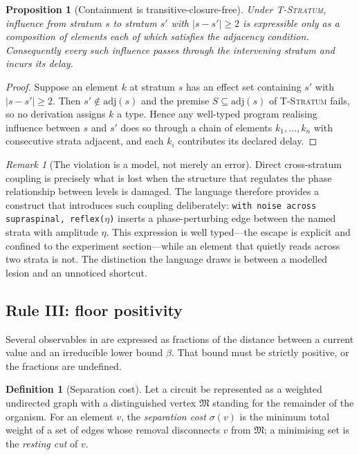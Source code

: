 \documentclass[11pt,twocolumn,a4paper]{article}
\theoremstyle{thmstyle}
\newtheorem{proposition}[theorem]{Proposition}
\theoremstyle{definition}
\newtheorem{definition}[theorem]{Definition}
\theoremstyle{remark}
\newtheorem{remark}[theorem]{Remark}
\newcommand{\med}{\mathfrak{M}}
\newcommand{\sep}{\sigma}
\newcommand{\flo}{\beta}
\newcommand{\abs}[1]{\lvert#1\rvert}
\begin{document}
\begin{proposition}[Containment is transitive-closure-free]
\label{prop:containment}
Under \textsc{T-Stratum}, influence from stratum $s$ to stratum $s'$ with
$\abs{s-s'}\ge2$ is expressible only as a composition of elements each of
which satisfies the adjacency condition. Consequently every such influence
passes through the intervening stratum and incurs its delay.
\end{proposition}

\begin{proof}
Suppose an element $k$ at stratum $s$ has an effect set containing $s'$ with
$\abs{s-s'}\ge2$. Then $s'\notin\mathrm{adj}(s)$ and the premise
$S\subseteq\mathrm{adj}(s)$ of \textsc{T-Stratum} fails, so no derivation
assigns $k$ a type. Hence any well-typed program realising influence between
$s$ and $s'$ does so through a chain of elements $k_1,\dots,k_n$ with
consecutive strata adjacent, and each $k_i$ contributes its declared delay.
\end{proof}

\begin{remark}[The violation is a model, not merely an error]
\label{rem:violation-is-model}
Direct cross-stratum coupling is precisely what is lost when the structure
that regulates the phase relationship between levels is damaged. The language
therefore provides a construct that introduces such coupling deliberately:
\texttt{with noise across supraspinal, reflex($\eta$)} inserts a
phase-perturbing edge between the named strata with amplitude $\eta$. This
expression is well typed---the escape is explicit and confined to the
experiment section---while an element that quietly reads across two strata is
not. The distinction the language draws is between a modelled lesion and an
unnoticed shortcut.
\end{remark}

\subsection{Rule III: floor positivity}
\label{sec:floor-rule}

Several observables in  are expressed as fractions of the
distance between a current value and an irreducible lower bound $\flo$. That
bound must be strictly positive, or the fractions are undefined.

\begin{definition}[Separation cost]
\label{def:sepcost}
Let a circuit be represented as a weighted undirected graph with a
distinguished vertex $\med$ standing for the remainder of the organism. For an
element $v$, the \emph{separation cost} $\sep(v)$ is the minimum total weight
of a set of edges whose removal disconnects $v$ from $\med$; a minimising set
is the \emph{resting cut} of $v$.
\end{definition}
\end{document}
